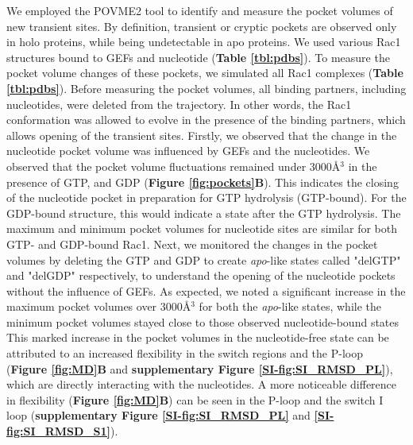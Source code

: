 \documentclass[12pt, a4paper]{achemso}
\begin{document}
We employed the POVME2\cite{durrant2014povme} tool to identify and measure the pocket volumes of new transient sites. By definition, transient or cryptic pockets are observed only in holo proteins, while being undetectable in apo proteins. We used various Rac1 structures bound to GEFs and nucleotide (\textbf{Table \ref{tbl:pdbs}}). To measure the pocket volume changes of these pockets, we simulated all Rac1 complexes (\textbf{Table \ref{tbl:pdbs}}). Before measuring the pocket volumes, all binding partners, including nucleotides, were deleted from the trajectory. In other words, the Rac1 conformation was allowed to evolve in the presence of the binding partners, which allows opening of the transient sites.
Firstly, we observed that the change in the nucleotide pocket volume was influenced by GEFs and the nucleotides. We observed that the pocket volume fluctuations remained under 3000\r{A}$^3$ in the presence of GTP, and GDP (\textbf{Figure \ref{fig:pockets}B}). This indicates the closing of the nucleotide pocket in preparation for GTP hydrolysis (GTP-bound). For the GDP-bound structure, this would indicate a state after the GTP hydrolysis. The maximum and minimum pocket volumes for nucleotide sites are similar for both GTP- and GDP-bound Rac1. Next, we monitored the changes in the pocket volumes by deleting the GTP and GDP to create \textit{apo}-like states called "delGTP" and "delGDP" respectively, to understand the opening of the nucleotide pockets without the influence of GEFs. As expected, we noted a significant increase in the maximum pocket volumes over 3000\r{A}$^3$ for both the \textit{apo}-like states, while the minimum pocket volumes stayed close to those observed nucleotide-bound states This marked increase in the pocket volumes in the nucleotide-free state can be attributed to an increased flexibility in the switch regions and the P-loop (\textbf{Figure \ref{fig:MD}B} and  \textbf{supplementary Figure \ref{SI-fig:SI_RMSD_PL}}), which are directly interacting with the nucleotides. A more noticeable difference in flexibility (\textbf{Figure \ref{fig:MD}B}) can be seen in the P-loop and the switch I loop (\textbf{supplementary Figure \ref{SI-fig:SI_RMSD_PL}} and \textbf{\ref{SI-fig:SI_RMSD_S1}}). 
\end{document}
